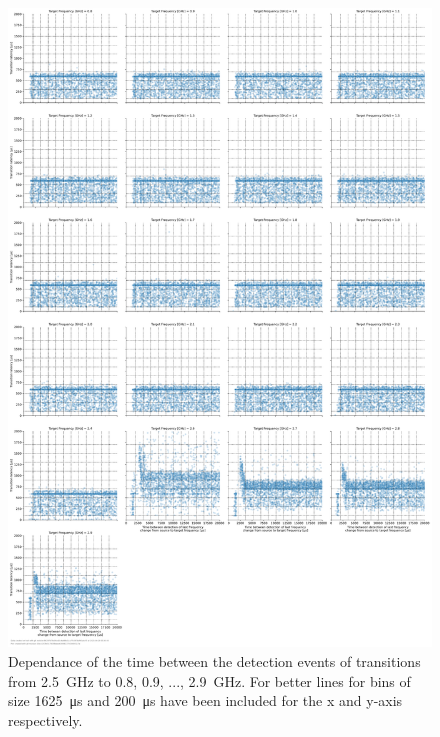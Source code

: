 \begin{figure}[]
    \centering
    \includegraphics[width=\columnwidth]{fig/ftalat/ftalat_scatter_wait_transition_latency_hati_source_2.5.pdf}
    \caption{Dependance of the time between the detection events of transitions from \SI{2.5}{\GHz} to \SI{0.8}{}, \SI{0.9}{}, ..., \SI{2.9}{\GHz}. For better lines for bins of size \SI{1625}{\us} and \SI{200}{\us} have been included for the x and y-axis respectively.}
\end{figure}
